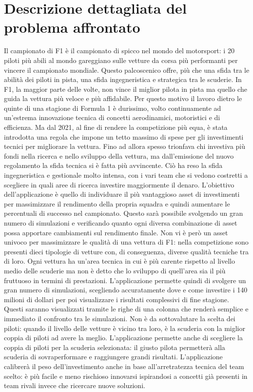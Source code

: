 
\chapter{Descrizione dettagliata del problema affrontato}

\label{Capitolo 2}

Il campionato di F1 è il campionato di spicco nel mondo del motorsport: i 20 piloti più abili al mondo gareggiano sulle vetture da corsa più performanti per vincere il campionato mondiale. Questo palcoscenico offre, più che una sfida tra le abilità dei piloti in pista, una sfida ingegneristica e strategica tra le scuderie. In F1, la maggior parte delle volte, non vince il miglior pilota in pista ma quello che guida la vettura più veloce e più affidabile.
Per questo motivo il lavoro dietro le quinte di una stagione di Formula 1 è durissimo, volto continuamente ad un’estrema innovazione tecnica di concetti aerodinamici, motoristici e di efficienza. 
Ma dal 2021, al fine di rendere la competizione più equa, è stata introdotta una regola che impone un tetto massimo di spese per gli investimenti tecnici per migliorare la vettura. Fino ad allora spesso trionfava chi investiva più fondi nella ricerca e nello sviluppo della vettura, ma dall’emissione del nuovo regolamento la sfida tecnica si è fatta più avvincente.
Ciò ha reso la sfida ingegneristica e gestionale molto intensa, con i vari team che si vedono costretti a scegliere in quali aree di ricerca investire maggiormente il denaro. 
L’obiettivo dell’applicazione è quello di individuare il più vantaggioso asset di investimenti per massimizzare il rendimento della propria squadra e quindi aumentare le percentuali di successo nel campionato. 
Questo sarà possibile svolgendo un gran numero di simulazioni e verificando quanto ogni diversa combinazione di asset possa apportare cambiamenti sul rendimento finale.
Non vi è però un asset univoco per massimizzare le qualità di una vettura di F1: nella competizione sono presenti dieci tipologie di vetture con, di conseguenza, diverse qualità tecniche tra di loro.
Ogni vettura ha un’area tecnica in cui è più carente rispetto al livello medio delle scuderie ma non è detto che lo sviluppo di quell’area sia il più fruttuoso in termini di prestazioni.
L’applicazione permette quindi di svolgere un gran numero di simulazioni, scegliendo accuratamente dove e come investire i 140 milioni di dollari per poi visualizzare i risultati complessivi di fine stagione. Questi saranno visualizzati tramite le righe di una colonna che renderà semplice e immediato il confronto tra le simulazioni.
Non è da sottovalutare la scelta dei piloti: quando il livello delle vetture è vicino tra loro, è la scuderia con la miglior coppia di piloti ad avere la meglio. 
L’applicazione permette anche di scegliere la coppia di piloti per la scuderia selezionata: il giusto pilota permetterà alla scuderia di sovraperformare e raggiungere grandi risultati.
L’applicazione calibrerà il peso dell’investimento anche in base all’arretratezza tecnica del team scelto: è più facile e meno rischioso innovarsi ispirandosi a concetti già presenti in team rivali invece che ricercare nuove soluzioni.
